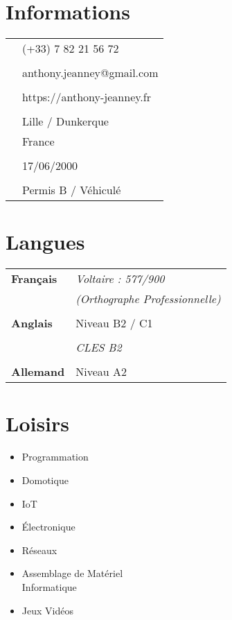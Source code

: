 \documentclass[a4paper, 12pt]{article}
\begin{document}
	\begin{minipage}[t]{0.35\textwidth}
		
		\section*{\textcolor{sectioncolor}{Informations}}
		\begin{tabular}{ m{} m{} }
			\textbf{\faPhone} & (+33) 7 82 21 56 72 \\
			& \\
			\textbf{\faEnvelope} & anthony.jeanney@gmail.com \\
			& \\
			\textbf{\faGlobe} & https://anthony-jeanney.fr \\
			& \\
			\textbf{\faMapMarker} & Lille / Dunkerque \\
			& France \\
			& \\
			\textbf{\faBirthdayCake} & 17/06/2000 \\
			& \\
			\textbf{\faCar} & Permis B / Véhiculé \\
		\end{tabular}
		
		\section*{\textcolor{sectioncolor}{Langues}}
		\begin{tabular}{ m{} m{} } 
			\textbf{Français} & \textit{Voltaire : 577/900} \\
			& \textit{(Orthographe Professionnelle)} \\
			& \\
			\textbf{Anglais} & Niveau B2 / C1 \\
			& \\
			& \textit{CLES B2} \\
			& \\
			\textbf{Allemand} & Niveau A2
		\end{tabular}
		
		\section*{\textcolor{sectioncolor}{Loisirs}}
		\begin{itemize}[leftmargin=0.5cm, label={\textcolor{itemcolor}{\faAngleRight}}]
			\item Programmation
			\item Domotique
			\item IoT
			\item Électronique
			\item Réseaux
			\item Assemblage de Matériel\\ Informatique
			\item Jeux Vidéos
		\end{itemize}
		

\end{minipage}
\end{document}
